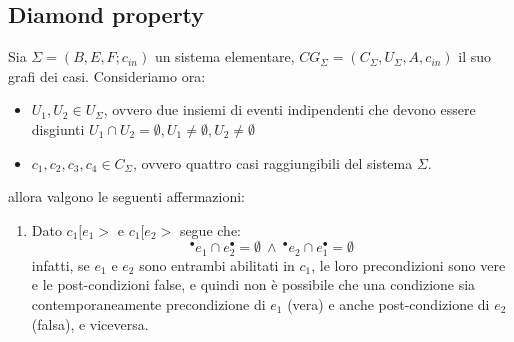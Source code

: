 \subsection{Diamond property}
\begin{definizione} 
    Sia $\Sigma = (B, E, F; c_{in})$ un sistema elementare,
    $CG_{\Sigma} = (C_{\Sigma},U_{\Sigma}, A, c_{in})$ il suo grafi dei casi.
    Consideriamo ora:
    \begin{itemize}
        \item  $U_1,U_2 \in U_{\Sigma}$, ovvero due insiemi di eventi indipendenti
              che devono essere disgiunti $U_1 \cap U_2 = \emptyset, U_1 \neq
                  \emptyset, U_2 \neq \emptyset$
        \item $c_1, c_2, c_3, c_4 \in C_{\Sigma}$, ovvero quattro casi
              raggiungibili del sistema $\Sigma$.
    \end{itemize}
    allora valgono le seguenti affermazioni:
    \begin{enumerate}
        \item Dato $c_1[e_1 >$ e $c_1[e_2 >$ segue che:
              \begin{equation}
                  ^{\bullet}e_1 \cap e_2^{\bullet} = \emptyset \ \land \
                  ^{\bullet}e_2 \cap e_1^{\bullet} = \emptyset
              \end{equation}
              infatti, se $e_1$ e $e_2$ sono entrambi abilitati in $c_1$, le loro
              precondizioni sono vere e le post-condizioni false, e quindi non è
              possibile che una condizione sia contemporaneamente precondizione di
              $e_1$ (vera) e anche post-condizione di $e_2$ (falsa), e viceversa.


\end{enumerate}
\end{definizione}
